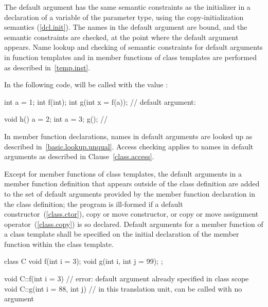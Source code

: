 \pnum
{}%
%
%
The default argument has the
same semantic constraints as the initializer in a
declaration of a variable of the parameter type, using the
copy-initialization semantics (\ref{dcl.init}).
The names in the
default argument are bound, and the semantic constraints are checked,
at the point where the default argument appears.
Name lookup and checking of semantic constraints for default
arguments in function templates and in member functions of
class templates are performed as described in~\ref{temp.inst}.
\begin{example}
In the following code,
%
will be called with the value
:

\begin{codeblock}
int a = 1;
int f(int);
int g(int x = f(a));            // default argument: 

void h() {
  a = 2;
  {
  int a = 3;
  g();                          // 
  }
}
\end{codeblock}
\end{example}
\begin{note}
In member function declarations,
names in default arguments are looked up
as described in~\ref{basic.lookup.unqual}.
Access checking applies to names in default arguments as
described in Clause~\ref{class.access}.
\end{note}

\pnum
Except for member functions of class templates, the
default arguments in a member function definition that appears
outside of the class definition
are added to the set of default arguments provided by the
member function declaration in the class definition;
the program is ill-formed if a default constructor~(\ref{class.ctor}),
copy or move constructor, or copy or move assignment operator~(\ref{class.copy})
is so declared.
Default arguments for a member function of a class template
shall be specified on the initial declaration of the member
function within the class template.
\begin{example}
\begin{codeblock}
class C {
  void f(int i = 3);
  void g(int i, int j = 99);
};

void C::f(int i = 3) {}         // error: default argument already specified in class scope
void C::g(int i = 88, int j) {} // in this translation unit,  can be called with no argument
\end{codeblock}
\end{example}

